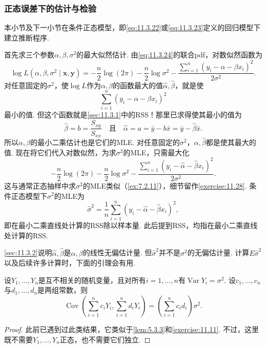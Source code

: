 \subsubsection{正态误差下的估计与检验}\label{sec:11.3.4}
本小节及下一小节在条件正态模型，即\eqref{eq:11.3.22}或\eqref{eq:11.3.23}定义的回归模型下建立推断程序.

首先求三个参数$\alpha,\beta,\sigma^2$的最大似然估计. 由\eqref{eq:11.3.24}的联合pdf，对数似然函数为
$$\log L(\alpha,\beta,\sigma^2\mid\boldsymbol x,\boldsymbol y)
=-\frac n2\log(2\pi)-\frac n2\log\sigma^2
-\frac{\sum_{i=1}^n(y_i-\alpha-\beta x_i)^2}{2\sigma^2}.$$
对任意固定的$\sigma^2$，使$\log L$作为$\alpha,\beta$的函数最大的值$\hat\alpha,\hat\beta$，就是使
$$\sum_{i=1}^n(y_i-\alpha-\beta x_i)^2$$
最小的值. 但这个函数就是\autoref{sec:11.3.1}中的RSS！那里已求得使其最小的值为
$$\hat\beta=b=\frac{S_{xy}}{S_{xx}}\quad\text{且}\quad
\hat\alpha=a=\bar y-b\bar x=\bar y-\hat\beta\bar x.$$
所以$\alpha,\beta$的最小二乘估计也是它们的MLE. 对任意固定的$\sigma^2$，$\hat\alpha,\hat\beta$都是使其最大的值. 现在将它们代入对数似然，为求$\sigma^2$的MLE，只需最大化
$$-\frac n2\log(2\pi)-\frac n2\log\sigma^2
-\frac{\sum_{i=1}^n(y_i-\hat\alpha-\hat\beta x_i)^2}{2\sigma^2}.$$
这与通常正态抽样中求$\sigma^2$的MLE类似（\autoref{ex:7.2.11}），细节留作\autoref{exercise:11.28}. 条件正态模型下$\sigma^2$的MLE为
$$\hat\sigma^2=\frac1n\sum_{i=1}^n(y_i-\hat\alpha-\hat\beta x_i)^2,$$
即在最小二乘直线处计算的RSS除以样本量. 此后提到RSS，均指在最小二乘直线处计算的RSS.

\autoref{sec:11.3.2}说明$\hat\alpha,\hat\beta$是$\alpha,\beta$的线性无偏估计量. 但$\hat\sigma^2$并不是$\sigma^2$的无偏估计量. 计算$E\hat\sigma^2$以及后续许多计算时，下面的引理会有用.

\begin{lemma}\label{lem:11.3.2}
设$Y_1,\ldots,Y_n$是互不相关的随机变量，且对所有$i=1,\ldots,n$有$\operatorname{Var}Y_i=\sigma^2$. 设$c_1,\ldots,c_n$与$d_1,\ldots,d_n$是两组常数，则
$$\operatorname{Cov}\left(\sum_{i=1}^nc_iY_i,\sum_{i=1}^nd_iY_i\right)
=\left(\sum_{i=1}^nc_id_i\right)\sigma^2.$$
\end{lemma}
\begin{proof}
此前已遇到过此类结果，它类似于\autoref{lem:5.3.3}和\autoref{exercise:11.11}. 不过，这里既不需要$Y_1,\ldots,Y_n$正态，也不需要它们独立.
\end{proof}

